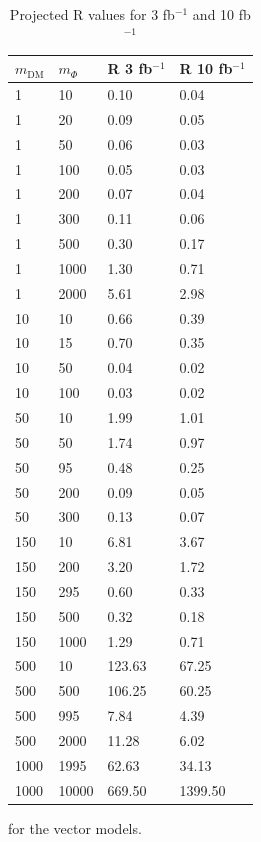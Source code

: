 \begin{table}[h]
\centering
\begin{tabular}{llll}
\hline                      
 $m_\textrm{DM}$ & $m_\Phi$  & R 3 fb$^{-1}$ & R 10 fb$^{-1}$ \\ \hline
1       & 10      & 0.10    & 0.04 \\ \hline
1       & 20      & 0.09    & 0.05 \\ \hline
1       & 50      & 0.06    & 0.03 \\ \hline
1       & 100     & 0.05    & 0.03 \\ \hline
1       & 200     & 0.07    & 0.04 \\ \hline
1       & 300     & 0.11    & 0.06 \\ \hline
1       & 500     & 0.30    & 0.17 \\ \hline
1       & 1000    & 1.30    & 0.71 \\ \hline
1       & 2000    & 5.61    & 2.98 \\ \hline
10      & 10      & 0.66    & 0.39 \\ \hline
10      & 15      & 0.70    & 0.35 \\ \hline
10      & 50      & 0.04    & 0.02 \\ \hline
10      & 100     & 0.03    & 0.02 \\ \hline
50      & 10      & 1.99    & 1.01 \\ \hline
50      & 50      & 1.74    & 0.97 \\ \hline
50      & 95      & 0.48    & 0.25 \\ \hline
50      & 200     & 0.09    & 0.05 \\ \hline
50      & 300     & 0.13    & 0.07 \\ \hline
150     & 10      & 6.81    & 3.67 \\ \hline
150     & 200     & 3.20    & 1.72 \\ \hline
150     & 295     & 0.60    & 0.33 \\ \hline
150     & 500     & 0.32    & 0.18 \\ \hline
150     & 1000    & 1.29    & 0.71 \\ \hline
500     & 10      & 123.63  & 67.25 \\ \hline
500     & 500     & 106.25  & 60.25 \\ \hline
500     & 995     & 7.84    & 4.39 \\ \hline
500     & 2000    & 11.28   & 6.02 \\ \hline
1000    & 1995    & 62.63   & 34.13 \\ \hline
1000    & 10000   & 669.50  & 1399.50 \\ \hline
\end{tabular}
\caption{Projected R values for 3 fb$^{-1}$ and 10 fb$^{-1}$} for the vector models.
\label{tab:dm_V_R_values}
\end{table}


